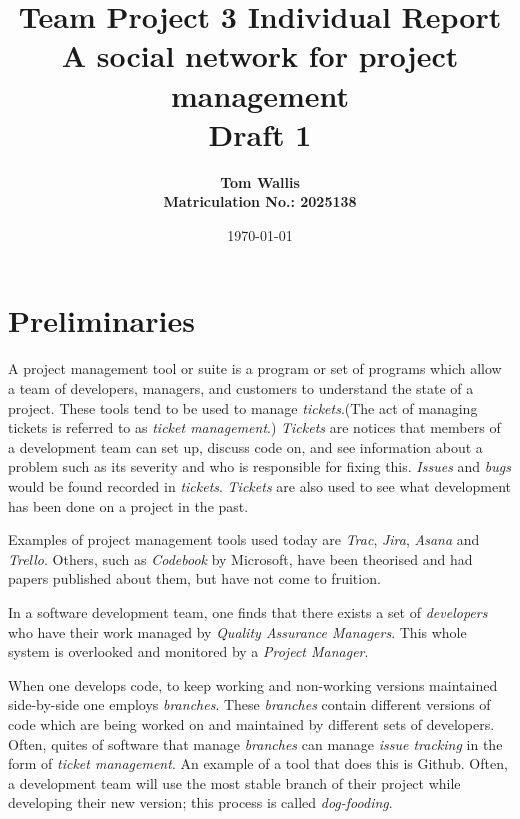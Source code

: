 \documentclass[draft, 10pt]{article}
\author{\bf Tom Wallis \\ \bf Matriculation No.: 2025138}
\date{\today}
\title{Team Project 3 Individual Report\\
A social network for project management\\ \vspace{4mm}
Draft 1}
\begin{document}
\maketitle


\section{Preliminaries}\par
A project management tool or suite is a program or set of programs which allow a team of developers, managers, and customers to understand the state of a project. These tools tend to be used to manage \emph{tickets}.(The act of managing tickets is referred to as \emph{ticket management}.) \emph{Tickets} are notices that members of a development team can set up, discuss code on, and see information about a problem such as its severity and who is responsible for fixing this. \emph{Issues} and \emph{bugs} would be found recorded in \emph{tickets}. \emph{Tickets} are also used to see what development has been done on a project in the past. \par
Examples of project management tools used today are \emph{Trac}, \emph{Jira}, \emph{Asana} and \emph{Trello}. Others, such as \emph{Codebook} by Microsoft, have been theorised and had papers published about them, but have not come to fruition. \par
In a software development team, one finds that there exists a set of \emph{developers} who have their work managed by \emph{Quality Assurance Managers}. This whole system is overlooked and monitored by a \emph{Project Manager}. \par
When one develops code, to keep working and non-working versions maintained side-by-side one employs \emph{branches}. These \emph{branches} contain different versions of code which are being worked on and maintained by different sets of developers. Often, quites of software that manage \emph{branches} can manage \emph{issue tracking} in the form of \emph{ticket management}. An example of a tool that does this is Github. Often, a development team will use the most stable branch of their project while developing their new version; this process is called \emph{dog-fooding}.\par
\end{document}
